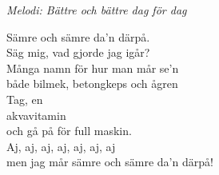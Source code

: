 {\footnotesize\textit{Melodi: Bättre och bättre dag för dag}}\par
\vspace{10pt}
Sämre och sämre da'n därpå.\\
Säg mig, vad gjorde jag igår?\\
Många namn för hur man mår se'n\\
både bilmek, betongkeps och ågren\\
Tag, en\\
akvavitamin\\
och gå på för full maskin.\\
Aj, aj, aj, aj, aj, aj, aj\\
men jag mår sämre och sämre da'n därpå!
